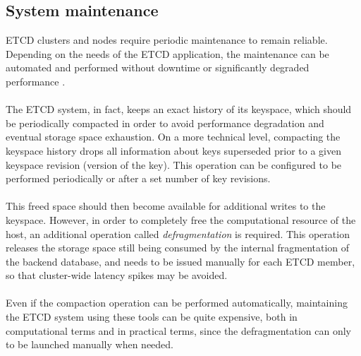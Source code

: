 \subsection{System maintenance}
ETCD clusters and nodes require periodic maintenance to remain reliable. Depending on the needs of the ETCD application, the maintenance can be automated and performed without downtime or significantly degraded performance \cite{site:etcd-maintenance}. \\ \\
The ETCD system, in fact, keeps an exact history of its keyspace, which should be periodically compacted in order to avoid performance degradation and eventual storage space exhaustion. On a more technical level, compacting the keyspace history drops all information about keys superseded prior to a given keyspace revision (version of the key). This operation can be configured to be performed periodically or after a set number of key revisions. \\ \\
This freed space should then become available for additional writes to the keyspace. However, in order to completely free the computational resource of the host, an additional operation called \textit{defragmentation} is required. This operation releases the storage space still being consumed by the internal fragmentation of the backend database, and needs to be issued manually for each ETCD member, so that cluster-wide latency spikes may be avoided. \\ \\
Even if the compaction operation can be performed automatically, maintaining the ETCD system using these tools can be quite expensive, both in computational terms and in practical terms, since the defragmentation can only to be launched manually when needed.

